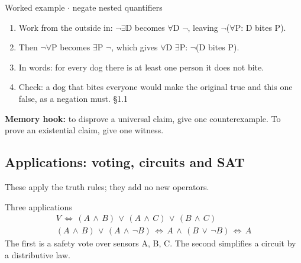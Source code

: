 \documentclass[11pt]{article}
\begin{document}
\begin{keepsection}
\begin{keepsection}
\begin{workedbox}{Worked example \ensuremath{\cdot} negate nested quantifiers}
\begin{enumerate}
\item Work from the outside in: \ensuremath{\neg}\ensuremath{\exists}D becomes \ensuremath{\forall}D \ensuremath{\neg}, leaving \ensuremath{\neg}(\ensuremath{\forall}P: D bites P).
\item Then \ensuremath{\neg}\ensuremath{\forall}P becomes \ensuremath{\exists}P \ensuremath{\neg}, which gives \ensuremath{\forall}D \ensuremath{\exists}P: \ensuremath{\neg}(D bites P).
\item In words: for every dog there is at least one person it does not bite.
\item Check: a dog that bites everyone would make the original true and this one false, as a negation must. \hfill{\small\color{FAUblue}§1.1}
\end{enumerate}
\end{workedbox}

\begin{notebox}\textbf{Memory hook:} to disprove a universal claim, give one counterexample. To prove an existential claim, give one witness.\end{notebox}
\end{keepsection}

\begin{keepsection}
\subsection{Applications: voting, circuits and SAT}

These apply the truth rules; they add no new operators.

\begin{equationcard}{Three applications}
\[ \begin{gathered} {V}\, \Leftrightarrow \, ({A}\, \land \, {B})\, \lor \, ({A}\, \land \, {C})\, \lor \, ({B}\, \land \, {C}) \\ ({A}\, \land \, {B})\, \lor \, ({A}\, \land \, \neg {B})\, \Leftrightarrow \, {A}\, \land \, ({B}\, \lor \, \neg {B})\, \Leftrightarrow \, {A} \end{gathered} \]
{\small The first is a safety vote over sensors A, B, C. The second simplifies a circuit by a distributive law.}
\end{equationcard}


\end{keepsection}
\end{keepsection}
\end{document}
